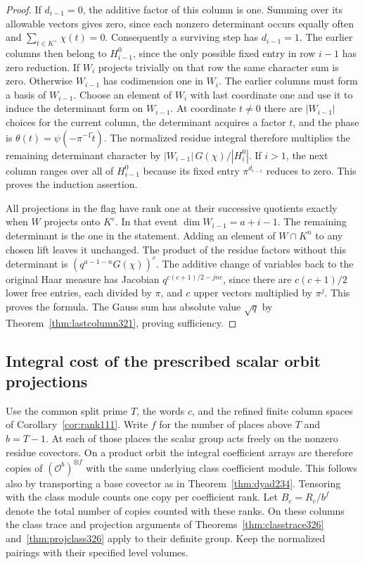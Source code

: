 \documentclass[a4paper,11pt]{article}
\theoremstyle{definition}
\theoremstyle{remark}
\numberwithin{equation}{section}
\begin{document}
\begin{proof}
If \(d_{i-1}=0\), the additive factor of this column is
one. Summing over its allowable vectors gives zero, since
each nonzero determinant occurs equally often and
\(\sum_{t\in K^\times}\chi(t)=0\). Consequently a surviving
step has \(d_{i-1}=1\). The earlier columns then belong to
\(H_{i-1}^0\), since the only possible fixed entry in row
\(i-1\) has zero reduction. If \(W_i\) projects trivially
on that row the same character sum is zero. Otherwise
\(W_{i-1}\) has codimension one in \(W_i\). The earlier
columns must form a basis of \(W_{i-1}\). Choose an element
of \(W_i\) with last coordinate one and use it to induce
the determinant form on \(W_{i-1}\). At coordinate \(t\ne0\)
there are \(|W_{i-1}|\) choices for the current column,
the determinant acquires a factor \(t\), and the phase is
\(\theta(t)=\psi(-\pi^{-1}\widetilde t)\).
The normalized residue integral therefore multiplies the
remaining determinant character by
\(|W_{i-1}|\,G(\chi)/|H_i^0|\).
If \(i>1\), the next column ranges over all of \(H_{i-1}^0\)
because its fixed entry \(\pi^{d_{i-1}}\) reduces to zero.
This proves the induction assertion.

All projections in the flag have rank one at their
successive quotients exactly when \(W\) projects onto
\(K^c\). In that event \(\dim W_{i-1}=a+i-1\).
The remaining determinant is the one in the statement.
Adding an element of \(W\cap K^n\) to any chosen lift
leaves it unchanged. The product of the residue factors
without this determinant is
\((q^{a-1-n}G(\chi))^c\). The additive change of variables
back to the original Haar measure has Jacobian
\(q^{c(c+1)/2-jnc}\), since there are \(c(c+1)/2\)
lower free entries, each divided by \(\pi\), and \(c\)
upper vectors multiplied by \(\pi^j\). This proves the
formula. The Gauss sum has absolute value \(\sqrt q\) by
Theorem~\ref{thm:lastcolumn321}, proving sufficiency.
\end{proof}

\subsection{Integral cost of the prescribed scalar orbit projections}\label{nav:VI-67}
Use the common split prime \(T\), the words \(c\), and the
refined finite column spaces of Corollary~\ref{cor:rank111}.
Write \(f\) for the number of places above \(T\) and
\(b=T-1\). At each of those places the scalar group acts
freely on the nonzero residue covectors. On a product orbit
the integral coefficient arrays are therefore copies of
\((\mathcal O^b)^{\otimes f}\) with the same underlying
class coefficient module. This follows also by transporting
a base covector as in Theorem~\ref{thm:dyad234}. Tensoring
with the class module counts one copy per coefficient rank.
Let \(B_c=R_c/b^f\) denote the total number of copies
counted with these ranks. On these columns the class trace
and projection arguments of Theorems~\ref{thm:classtrace326}
and~\ref{thm:projclass326} apply to their definite group.
Keep the normalized pairings with their specified level volumes.
\end{document}
